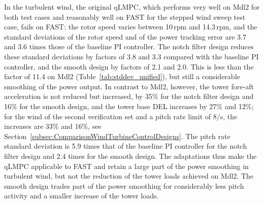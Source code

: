 In the turbulent wind, the original qLMPC, which performs very well on Mdl2 for both test cases and reasonably well on FAST for the stepped wind sweep test case, fails on FAST: the rotor speed varies between 10\,rpm and 14.3\,rpm, and the standard deviations of the rotor speed and of the power tracking error are 3.7 and 3.6 times those of the baseline PI controller. The notch filter design reduces these standard deviations by factors of 3.8 and 3.3 compared with the baseline PI controller, and the smooth design by factors of 2.1 and 2.0. This is less than the factor of 11.4 on Mdl2 (Table~\ref{tab:stddev_unified}), but still a considerable smoothing of the power output. In contrast to Mdl2, however, the tower fore-aft acceleration is not reduced but increased, by 35\% for the notch filter design and 16\% for the smooth design, and the tower base DEL increases by 27\% and 12\%; for the wind of the second verification set and a pitch rate limit of 8\textdegree/s, the increases are 33\% and 16\%, see Section~\ref{subsec:ComparisonWindTurbineControlDesigns}. The pitch rate standard deviation is 5.9 times that of the baseline PI controller for the notch filter design and 2.4 times for the smooth design. The adaptations thus make the qLMPC applicable to FAST and retain a large part of the power smoothing in turbulent wind, but not the reduction of the tower loads achieved on Mdl2. The smooth design trades part of the power smoothing for considerably less pitch activity and a smaller increase of the tower loads.

